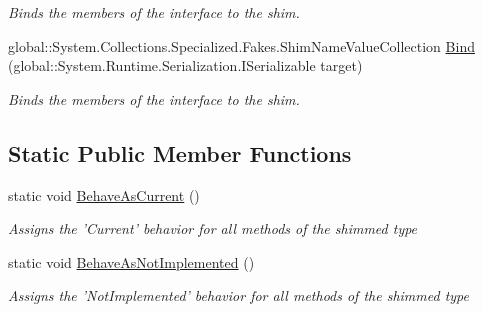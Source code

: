 \begin{DoxyCompactItemize}
\begin{DoxyCompactList}\small\item\em Binds the members of the interface to the shim.\end{DoxyCompactList}\item 
global\-::\-System.\-Collections.\-Specialized.\-Fakes.\-Shim\-Name\-Value\-Collection \hyperlink{class_system_1_1_collections_1_1_specialized_1_1_fakes_1_1_shim_name_value_collection_a76410892c9ed67e0b6afd5e14f2ddb7f}{Bind} (global\-::\-System.\-Runtime.\-Serialization.\-I\-Serializable target)
\begin{DoxyCompactList}\small\item\em Binds the members of the interface to the shim.\end{DoxyCompactList}\end{DoxyCompactItemize}
\subsection*{Static Public Member Functions}
\begin{DoxyCompactItemize}
\item 
static void \hyperlink{class_system_1_1_collections_1_1_specialized_1_1_fakes_1_1_shim_name_value_collection_a9198f5bb28cb974a73ac9b5039d4e735}{Behave\-As\-Current} ()
\begin{DoxyCompactList}\small\item\em Assigns the 'Current' behavior for all methods of the shimmed type\end{DoxyCompactList}\item 
static void \hyperlink{class_system_1_1_collections_1_1_specialized_1_1_fakes_1_1_shim_name_value_collection_a52a6fcf817c28607c70159ed38be1443}{Behave\-As\-Not\-Implemented} ()
\begin{DoxyCompactList}\small\item\em Assigns the 'Not\-Implemented' behavior for all methods of the shimmed type\end{DoxyCompactList}\end{DoxyCompactItemize}
